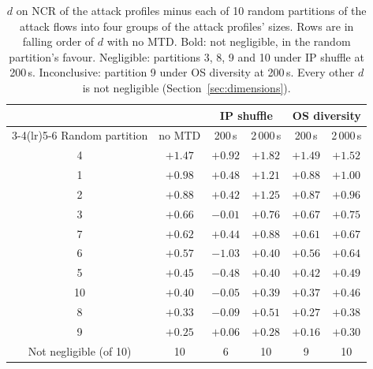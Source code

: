 \begin{table}[htbp]
  \centering
  \caption[The attack profiles against random partitions of the attack flows]{$d$ on NCR of the attack profiles minus each of 10 random partitions of the attack flows into four groups of the attack profiles' sizes. Rows are in falling order of $d$ with no MTD. Bold: not negligible, in the random partition's favour. Negligible: partitions 3, 8, 9 and 10 under IP shuffle at 200\,s. Inconclusive: partition 9 under OS diversity at 200\,s. Every other $d$ is not negligible (Section~\ref{sec:dimensions}).}
  \label{tab:ablation-random-partitions}
  \tablestyle
  \begin{tabular}{@{}cccccc@{}}
    \toprule
    & & \multicolumn{2}{c}{IP shuffle} & \multicolumn{2}{c}{OS diversity} \\
    \cmidrule(lr){3-4}\cmidrule(lr){5-6}
    \rowcolor{white}Random partition & no MTD & 200\,s & 2\,000\,s & 200\,s & 2\,000\,s \\
    \midrule
    4 & $+1.47$ & $+0.92$ & $+1.82$ & $+1.49$ & $+1.52$ \\
    1 & $+0.98$ & $+0.48$ & $+1.21$ & $+0.88$ & $+1.00$ \\
    2 & $+0.88$ & $+0.42$ & $+1.25$ & $+0.87$ & $+0.96$ \\
    3 & $+0.66$ & $-0.01$ & $+0.76$ & $+0.67$ & $+0.75$ \\
    7 & $+0.62$ & $+0.44$ & $+0.88$ & $+0.61$ & $+0.67$ \\
    6 & $+0.57$ & \bfseries\boldmath $-1.03$ & $+0.40$ & $+0.56$ & $+0.64$ \\
    5 & $+0.45$ & \bfseries\boldmath $-0.48$ & $+0.40$ & $+0.42$ & $+0.49$ \\
    10 & $+0.40$ & $-0.05$ & $+0.39$ & $+0.37$ & $+0.46$ \\
    8 & $+0.33$ & $-0.09$ & $+0.51$ & $+0.27$ & $+0.38$ \\
    9 & $+0.25$ & $+0.06$ & $+0.28$ & $+0.16$ & $+0.30$ \\
    \midrule
    \rowcolor{white}Not negligible (of 10) & 10 & 6 & 10 & 9 & 10 \\
    \bottomrule
  \end{tabular}
\end{table}
